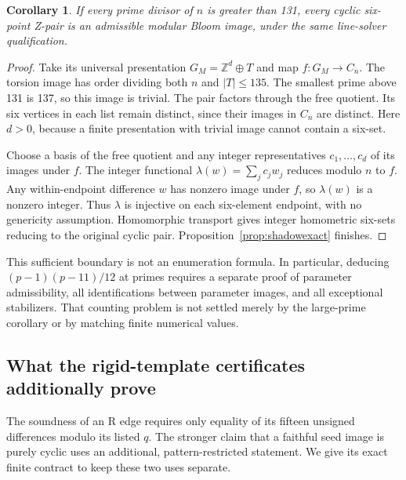 \documentclass[11pt]{article}
\newtheorem{corollary}[theorem]{Corollary}
\theoremstyle{remark}
\newcommand{\Z}{\mathbb Z}
\begin{document}
\begin{corollary}\label{cor:largeprime}
If every prime divisor of $n$ is greater than 131, every cyclic six-point
Z-pair is an admissible modular Bloom image, under the same line-solver
qualification.
\end{corollary}
\begin{proof}
Take its universal presentation $G_M=\Z^d\oplus T$ and map
$f\colon G_M\to C_n$. The torsion image has order dividing both $n$
and $|T|\le135$. The smallest prime above 131 is 137, so this image
is trivial. The pair factors through the free quotient. Its six vertices
in each list remain distinct, since their images in $C_n$ are distinct.
Here $d>0$, because a finite presentation with trivial image cannot
contain a six-set.

Choose a basis of the free quotient and any integer representatives
$c_1,\ldots,c_d$ of its images under $f$. The integer functional
$\lambda(w)=\sum_j c_jw_j$ reduces modulo $n$ to $f$. Any within-endpoint
difference $w$ has nonzero image under $f$, so $\lambda(w)$ is a nonzero
integer. Thus $\lambda$ is injective on each six-element endpoint, with
no genericity assumption. Homomorphic transport gives integer homometric
six-sets reducing to the original cyclic pair.
Proposition~\ref{prop:shadowexact} finishes.
\end{proof}

This sufficient boundary is not an enumeration formula. In particular,
deducing $(p-1)(p-11)/12$ at primes requires a separate proof of parameter
admissibility, all identifications between parameter images, and all
exceptional stabilizers. That counting problem is not settled merely by
the large-prime corollary or by matching finite numerical values.

\subsection{What the rigid-template certificates additionally prove}
The soundness of an R edge requires only equality of its fifteen unsigned
differences modulo its listed $q$. The stronger claim that a faithful seed
image is purely cyclic uses an additional, pattern-restricted statement.
We give its exact finite contract to keep these two uses separate.
\end{document}
